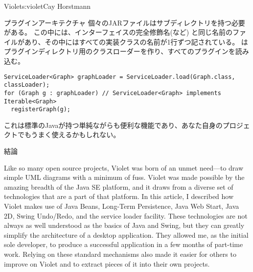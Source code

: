 \begin{aosachapter}{Violet}{s:violet}{Cay Horstmann}
\begin{aosasect1}{プラグインアーキテクチャ}
個々のJARファイルはサブディレクトリを持つ必要がある。
この中には、インターフェイスの完全修飾名(など)
と同じ名前のファイルがあり、その中にはすべての実装クラスの名前が1行ずつ記されている。
はプラグインディレクトリ用のクラスローダーを作り、すべてのプラグインを読み込む。

\begin{verbatim}
ServiceLoader<Graph> graphLoader = ServiceLoader.load(Graph.class, classLoader);
for (Graph g : graphLoader) // ServiceLoader<Graph> implements Iterable<Graph>
  registerGraph(g); 
\end{verbatim}

これは標準のJavaが持つ単純ながらも便利な機能であり、あなた自身のプロジェクトでもうまく使えるかもしれない。

\end{aosasect1}

\begin{aosasect1}{結論}

Like so many open source projects, Violet was born of an unmet
need---to draw simple UML diagrams with a minimum of fuss. Violet was
made possible by the amazing breadth of the Java SE platform, and it
draws from a diverse set of technologies that are a part of that
platform. In this article, I described how Violet makes use of Java
Beans, Long-Term Persistence, Java Web Start, Java 2D, Swing
Undo/Redo, and the service loader facility.  These technologies are
not always as well understood as the basics of Java and Swing, but
they can greatly simplify the architecture of a desktop
application. They allowed me, as the initial sole developer, to
produce a successful application in a few months of part-time work.
Relying on these standard mechanisms also made it easier for others to
improve on Violet and to extract pieces of it into their own projects.

\end{aosasect1}

\end{aosachapter}
